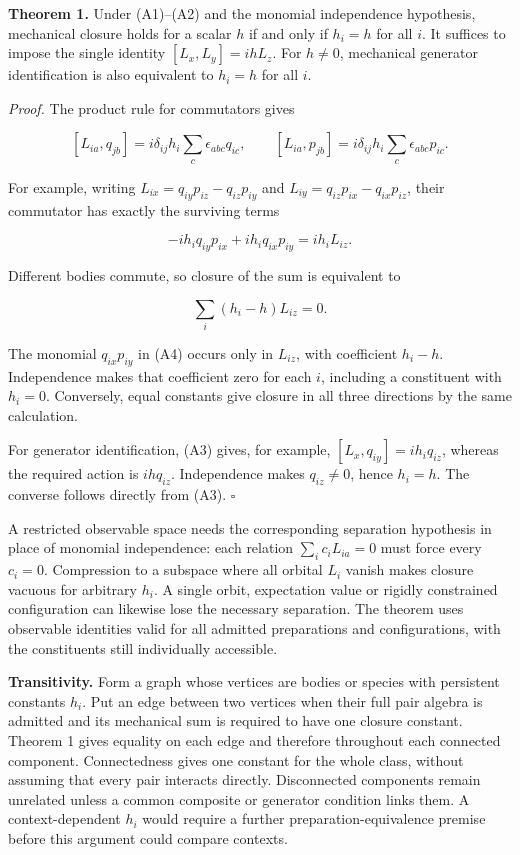 \documentclass[11pt,a4paper]{article}
\begin{document}
\textbf{Theorem 1.} Under (A1)--(A2) and the monomial independence
hypothesis, mechanical closure holds for a scalar \(h\) if and only if
\(h_i=h\) for all \(i\). It suffices to impose the single identity
\([L_x,L_y]=ihL_z\). For \(h\ne0\), mechanical generator identification
is also equivalent to \(h_i=h\) for all \(i\).

\emph{Proof.} The product rule for commutators gives

\[
[L_{ia},q_{jb}]=i\delta_{ij}h_i\sum_c\epsilon_{abc}q_{ic},\qquad
[L_{ia},p_{jb}]=i\delta_{ij}h_i\sum_c\epsilon_{abc}p_{ic}. \tag{A3}
\]

For example, writing \(L_{ix}=q_{iy}p_{iz}-q_{iz}p_{iy}\) and
\(L_{iy}=q_{iz}p_{ix}-q_{ix}p_{iz}\), their commutator has exactly the
surviving terms

\[
-i h_i q_{iy}p_{ix}+i h_i q_{ix}p_{iy}=ih_iL_{iz}.
\]

Different bodies commute, so closure of the sum is equivalent to

\[
\sum_i(h_i-h)L_{iz}=0. \tag{A4}
\]

The monomial \(q_{ix}p_{iy}\) in (A4) occurs only in \(L_{iz}\), with
coefficient \(h_i-h\). Independence makes that coefficient zero for each
\(i\), including a constituent with \(h_i=0\). Conversely, equal
constants give closure in all three directions by the same calculation.

For generator identification, (A3) gives, for example,
\([L_x,q_{iy}]=ih_iq_{iz}\), whereas the required action is
\(ihq_{iz}\). Independence makes \(q_{iz}\ne0\), hence \(h_i=h\). The
converse follows directly from (A3). \(\square\)

A restricted observable space needs the corresponding separation
hypothesis in place of monomial independence: each relation
\(\sum_i c_iL_{ia}=0\) must force every \(c_i=0\). Compression to a
subspace where all orbital \(L_i\) vanish makes closure vacuous for
arbitrary \(h_i\). A single orbit, expectation value or rigidly
constrained configuration can likewise lose the necessary separation.
The theorem uses observable identities valid for all admitted
preparations and configurations, with the constituents still
individually accessible.

\textbf{Transitivity.} Form a graph whose vertices are bodies or species
with persistent constants \(h_i\). Put an edge between two vertices when
their full pair algebra is admitted and its mechanical sum is required
to have one closure constant. Theorem 1 gives equality on each edge and
therefore throughout each connected component. Connectedness gives one
constant for the whole class, without assuming that every pair interacts
directly. Disconnected components remain unrelated unless a common
composite or generator condition links them. A context-dependent \(h_i\)
would require a further preparation-equivalence premise before this
argument could compare contexts.
\end{document}
